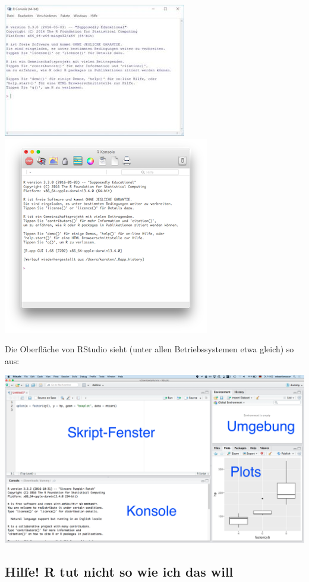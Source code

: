 \documentclass[12pt,]{book}
\begin{document}
\includegraphics{images/R-small.jpg}
\includegraphics{images/R-Mac-small.png}

Die Oberfläche von RStudio sieht (unter allen Betriebssystemen etwa
gleich) so aus:

\begin{center}\includegraphics[width=0.7\linewidth]{images/RStudio-Screenshot} \end{center}

\subsection{Hilfe! R tut nicht so wie ich das
will}\label{hilfe-r-tut-nicht-so-wie-ich-das-will}
\end{document}
